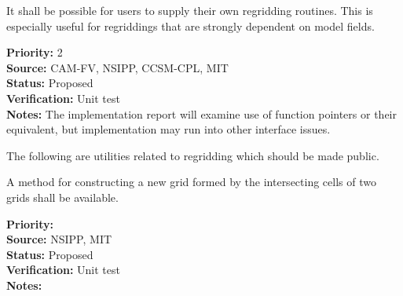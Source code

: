 
It shall be possible for users to supply their own regridding
routines.  This is especially useful for regriddings that are
strongly dependent on model fields.

\begin{reqlist}
{\bf Priority:} 2 \\
{\bf Source:}  CAM-FV, NSIPP, CCSM-CPL, MIT \\
{\bf Status:} Proposed \\
{\bf Verification:} Unit test \\
{\bf Notes:} The implementation report will examine use of
             function pointers or their equivalent, but implementation
             may run into other interface issues.

\end{reqlist}


The following are utilities related to regridding which should be made
public.


A method for constructing a new grid formed by the intersecting
cells of two grids shall be available.

\begin{reqlist}
{\bf Priority:}  \\
{\bf Source:}  NSIPP, MIT \\
{\bf Status:} Proposed \\
{\bf Verification:} Unit test \\
{\bf Notes:} 
\end{reqlist}

